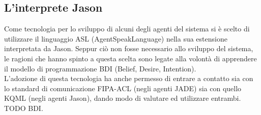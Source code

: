 
\subsection{L'interprete Jason}
Come tecnologia per lo sviluppo di alcuni degli agenti del sistema si è scelto di utilizzare il linguaggio ASL (AgentSpeakLanguage) nella sua estensione interpretata da Jason. Seppur ciò non fosse necessario allo sviluppo del sistema, le ragioni che hanno spinto a questa scelta sono legate alla volontà di apprendere il modello di programmazione BDI (Belief, Desire, Intention).\\
L'adozione di questa tecnologia ha anche permesso di entrare a contatto sia con lo standard di comunicazione FIPA-ACL (negli agenti JADE) sia con quello KQML (negli agenti Jason), dando modo di valutare ed utilizzare entrambi.
TODO BDI.


